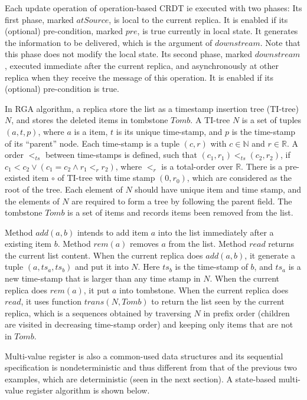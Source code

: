 Each update operation of operation-based CRDT ie executed with two phases: Its first phase, marked $\mathit{atSource}$, is local to the current replica. It is enabled if its (optional) pre-condition, marked $\mathit{pre}$, is true currently in local state. It generates the information to be delivered, which is the argument of $\mathit{downstream}$. Note that this phase does not modify the local state. Its second phase, marked $\mathit{downstream}$, executed immediate after the current replica, and asynchronously at other replica when they receive the message of this operation. It is enabled if its (optional) pre-condition is true.

In RGA algorithm, a replica store the list as a timestamp insertion tree (TI-tree) $N$, and stores the deleted items in tombstone $\mathit{Tomb}$. A TI-tree $N$ is a set of tuples $(a,t,p)$, where $a$ is a item, $t$ is its unique time-stamp, and $p$ is the time-stamp of its ``parent'' node. Each time-stamp is a tuple $(c,r)$ with $c \in \mathbb{N}$ and $r \in \mathbb{R}$. A order $<_{\mathit{ts}}$ between time-stamps is defined, such that $(c_1,r_1) <_{\mathit{ts}} (c_2,r_2)$, if $c_1 < c_2 \vee (c_1 = c_2 \wedge r_1 <_r r_2)$, where $<_r$ is a total-order over $\mathbb{R}$. There is a pre-existed item $\circ$ of TI-tree with time stamp $(0,r_0)$, which are considered as the root of the tree. Each element of $N$ should have unique item and time stamp, and the elements of $N$ are required to form a tree by following the parent field. The tombstone $\mathit{Tomb}$ is a set of items and records items been removed from the list.

Method $\mathit{add}(a,b)$ intends to add item $a$ into the list immediately after a existing item $b$. Method $\mathit{rem}(a)$ removes $a$ from the list. Method $\mathit{read}$ returns the current list content. When the current replica does $\mathit{add}(a,b)$, it generate a tuple $(a,ts_a,ts_b)$ and put it into $N$. Here $ts_b$ is the time-stamp of $b$, and $ts_a$ is a new time-stamp that is larger than any time stamp in $N$. When the current replica does $\mathit{rem}(a)$, it put $a$ into tombstone. When the current replica does $\mathit{read}$, it uses function $\mathit{trans}(N,\mathit{Tomb})$ to return the list seen by the current replica, which is a sequences obtained by traversing $N$ in prefix order (children are visited in decreasing time-stamp order) and keeping only items that are not in $\mathit{Tomb}$.


Multi-value register is also a common-used data structures and its sequential specification is nondeterministic and thus different from that of the previous two examples, which are deterministic (seen in the next section). A state-based multi-value register algorithm is shown below.


